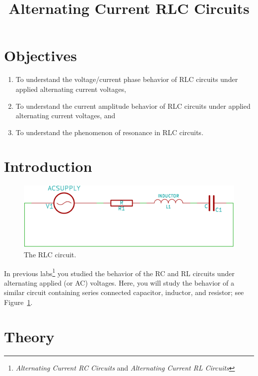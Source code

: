 \documentclass[12pt]{article}
\title{Alternating Current RLC Circuits}
\author{}
\date{}
\begin{document}
\maketitle

\section{Objectives}
\label{sec:objectives}

\begin{enumerate}
\item To understand the voltage/current phase behavior of RLC circuits
  under applied alternating current voltages,
\item To understand the current amplitude behavior of RLC circuits
  under applied alternating current voltages, and
\item To understand the phenomenon of resonance in RLC circuits.
\end{enumerate}

\section{Introduction}
\label{sec:introduction}

\begin{figure}
  \centering
  \includegraphics[width=2\textwidth/3]{figures/rlc-circuit}
  \caption{The RLC circuit.}
  \label{fig:rlccircuit}
\end{figure}
In previous labs\footnote{\textit{Alternating Current RC Circuits}
  and \textit{Alternating Current RL Circuits}} you studied the
behavior of the RC and RL circuits under alternating applied (or AC)
voltages.  Here, you will study the behavior of a similar circuit
containing series connected capacitor, inductor, and resistor; see
Figure~\ref{fig:rlccircuit}.

\section{Theory}
\label{sec:theory}
\end{document}
